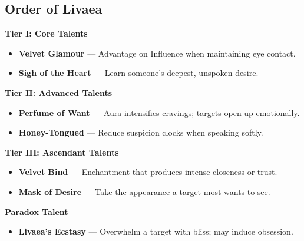 \documentclass[11pt]{book}
\begin{document}
\subsection*{Order of Livaea}
\begin{tcolorbox}[colback=mistgray!10,colframe=lanternamber,title={Order of Livaea --- Talents}]

\textbf{Tier I: Core Talents}
\begin{itemize}[noitemsep]
  \item \textbf{Velvet Glamour} --- Advantage on Influence when maintaining eye contact.
  \item \textbf{Sigh of the Heart} --- Learn someone's deepest, unspoken desire.
\end{itemize}

\textbf{Tier II: Advanced Talents}
\begin{itemize}[noitemsep]
  \item \textbf{Perfume of Want} --- Aura intensifies cravings; targets open up emotionally.
  \item \textbf{Honey-Tongued} --- Reduce suspicion clocks when speaking softly.
\end{itemize}

\textbf{Tier III: Ascendant Talents}
\begin{itemize}[noitemsep]
  \item \textbf{Velvet Bind} --- Enchantment that produces intense closeness or trust.
  \item \textbf{Mask of Desire} --- Take the appearance a target most wants to see.
\end{itemize}

\textbf{Paradox Talent}
\begin{itemize}[noitemsep]
  \item \textbf{Livaea's Ecstasy} --- Overwhelm a target with bliss; may induce obsession.
\end{itemize}

\end{tcolorbox}

\end{document}
